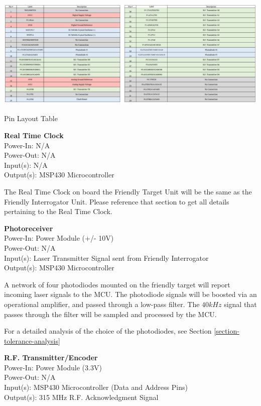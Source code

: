 \documentclass[letterpaper,10pt]{article}
\begin{document}
\begin{spacing}{1.15}
\begin{table} [H]
	\centering
		\includegraphics[scale=0.52]{MSP430_Pin_Assignments-Target.png}
	\caption{Pin Layout Table\label{tab:msp430-pin-assignments-target}}
\end{table}

\normalsize\textbf{Real Time Clock} \\
Power-In: N/A\\
Power-Out: N/A\\
Input(s): N/A\\
Output(s): MSP430 Microcontroller

The Real Time Clock on board the Friendly Target Unit will be the same as the Friendly Interrogator Unit. Please reference that section to get all details pertaining to the Real Time Clock.

\normalsize\textbf{Photoreceiver}\\
Power-In: Power Module (+/- 10V)\\
Power-Out: N/A \\
Input(s): Laser Transmitter Signal sent from Friendly Interrogator\\
Output(s): MSP430 Microcontroller

A network of four photodiodes mounted on the friendly target will report incoming laser signals to the MCU. The photodiode signals will be boosted via an operational amplifier, and passed through a low-pass filter. The $40kHz$ signal that passes through the filter will be sampled and processed by the MCU. 

For a detailed analysis of the choice of the photodiodes, see Section \ref{section-tolerance-analysis}

\normalsize\textbf{R.F. Transmitter/Encoder}\\
Power-In: Power Module (3.3V)\\
Power-Out: N/A\\ 
Input(s): MSP430 Microcontroller (Data and Address Pins)\\ 
Output(s): 315 MHz R.F. Acknowledgment Signal


\end{spacing}
\end{document}
